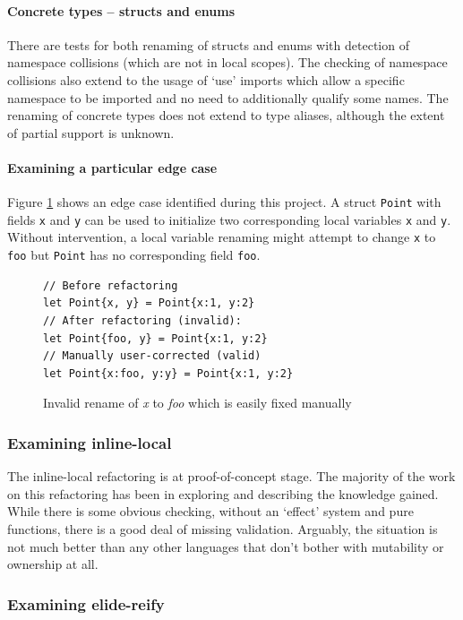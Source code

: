 \paragraph{Concrete types -- structs and enums}
There are tests for both renaming of structs and enums with detection of namespace collisions (which are not in local scopes). The checking of namespace collisions also extend to the usage of `use' imports which allow a specific namespace to be imported and no need to additionally qualify some names. The renaming of concrete types does not extend to type aliases, although the extent of partial support is unknown.

\paragraph{Examining a particular edge case}
Figure \ref{Fig:fix} shows an edge case identified during this project. A struct {\verb|Point|} with fields {\verb|x|} and {\verb|y|} can be used to initialize two corresponding local variables {\verb|x|} and {\verb|y|}. Without intervention, a local variable renaming might attempt to change {\verb|x|} to  {\verb|foo|} but {\verb|Point|} has no corresponding field {\verb|foo|}. 

\begin{figure}
\begin{verbatim}
// Before refactoring
let Point{x, y} = Point{x:1, y:2}
// After refactoring (invalid):
let Point{foo, y} = Point{x:1, y:2}
// Manually user-corrected (valid)
let Point{x:foo, y:y} = Point{x:1, y:2}
\end{verbatim}
\caption{Invalid rename of \emph{x} to \emph{foo} which is easily fixed manually}
\label{Fig:fix}
\end{figure}

\subsubsection{Examining inline-local}
The inline-local refactoring is at proof-of-concept stage. The majority of the work on this refactoring has been in exploring and describing the knowledge gained. While there is some obvious checking, without an `effect' system and pure functions, there is a good deal of missing validation. Arguably, the situation is not much better than any other languages that don't bother with mutability or ownership at all.

\subsubsection{Examining elide-reify}


